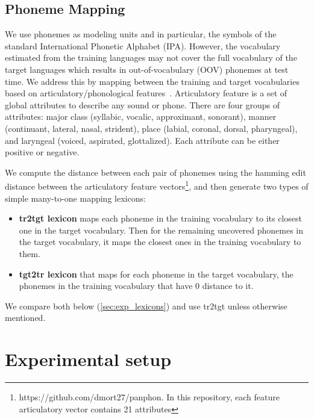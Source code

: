 \documentclass{article}
\newcommand{\ma}[1]{{\color{orange}#1}}
\begin{document}


\subsection{Phoneme Mapping}
\label{sec:mapping}

We use phonemes as modeling units and in particular, the symbols of the standard International Phonetic Alphabet (IPA). 
However, the vocabulary estimated from the training languages may not cover the full vocabulary of the target languages which results in out-of-vocabulary (OOV) phonemes at test time.
We address this by mapping between the training and target vocabularies based on articulatory/phonological features~\cite{Mortensen-et-al:2016}. 
Articulatory feature is a set of global attributes to describe any sound or phone. 
There are four groups of attributes: major class (syllabic, vocalic, approximant, sonorant), manner (continuant, lateral, nasal, strident), place (labial, coronal, dorsal, pharyngeal), and laryngeal (voiced, aspirated, glottalized). 
Each attribute can be either positive or negative.

We compute the distance between each pair of phonemes using the hamming edit distance between the articulatory feature vectors\footnote{https://github.com/dmort27/panphon. In this repository, each feature articulatory vector contains 21 attributes}, and then generate two types of simple many-to-one mapping lexicons:
\begin{itemize}
\item \textbf{tr2tgt lexicon} maps each phoneme in the training vocabulary to its closest one in the target vocabulary. Then for the remaining uncovered phonemes in the target vocabulary, it maps the closest ones in the training vocabulary to them.
\item \textbf{tgt2tr lexicon} that maps for each phoneme in the target vocabulary, the phonemes in the training vocabulary that have 0 distance to it.  
\end{itemize}
We compare both below (\textsection\ref{sec:exp_lexicons}) and use tr2tgt unless otherwise mentioned.


\section{Experimental setup}
\label{sec:expsetup}
\end{document}
